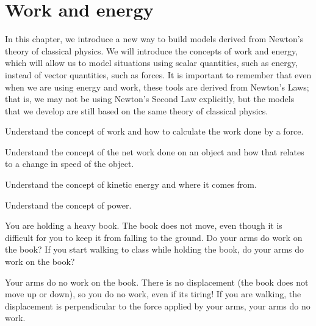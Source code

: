 \chapter{Work and energy}
\label{chap:workenergy}
In this chapter, we introduce a new way to build models derived from Newton's theory of classical physics. We will introduce the concepts of work and energy, which will allow us to model situations using scalar quantities, such as energy, instead of vector quantities, such as forces. It is important to remember that even when we are using energy and work, these tools are derived from Newton's Laws; that is, we may not be using Newton's Second Law explicitly, but the models that we develop are still based on the same theory of classical physics. 

\begin{learningObjectives}{
 \item Understand the concept of work and how to calculate the work done by a force.
 \item Understand the concept of the net work done on an object and how that relates to a change in speed of the object.
 \item Understand the concept of kinetic energy and where it comes from.
 \item Understand the concept of power.
 }
\end{learningObjectives}

\begin{opening}
You are holding a heavy book. The book does not move, even though it is difficult for you to keep it from falling to the ground. Do your arms do work on the book? If you start walking to class while holding the book, do your arms do work on the book? 

\begin{answer}
Your arms do no work on the book. There is no displacement (the book does not move up or down), so you do no work, even if its tiring! If you are walking, the displacement is perpendicular to the force applied by your arms, your arms do no work.
\end{answer}
\end{opening}

\newpage
